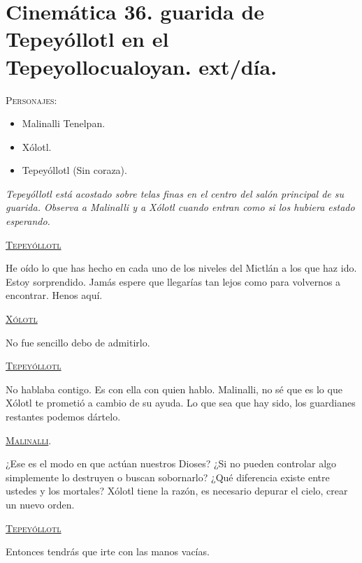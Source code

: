 \section{Cinemática 36. guarida de Tepeyóllotl en el Tepeyollocualoyan. ext/día. } \label{Cin:Cinematica36}
 \textsc{Personajes}:
 \begin{itemize}
 \item Malinalli Tenelpan.
 \item Xólotl.
 \item Tepeyóllotl (Sin coraza).
 \end{itemize}
\textit{Tepeyóllotl está acostado sobre telas finas en el centro del salón principal de su guarida. Observa a Malinalli y a Xólotl cuando entran como si los hubiera estado esperando.}
\begin{center}
\textsc{\underline{Tepeyóllotl}}
\\
\par
He oído lo que has hecho en cada uno de los niveles del Mictlán a los que haz ido. Estoy sorprendido. Jamás espere que llegarías tan lejos como para volvernos a encontrar. Henos aquí.
\\
\par
\textsc{\underline{Xólotl}}
\\
\par
No fue sencillo debo de admitirlo.
\\
\par
\textsc{\underline{Tepeyóllotl}}
\\
\par
No hablaba contigo. Es con ella con quien hablo. Malinalli, no sé que es lo que Xólotl te prometió a cambio de su ayuda. Lo que sea que hay sido, los guardianes restantes podemos dártelo. 
\\
\par
\textsc{\underline{Malinalli}}.
\\
\par
¿Ese es el modo en que actúan nuestros Dioses? ¿Si no pueden controlar algo simplemente lo destruyen o buscan sobornarlo? ¿Qué diferencia existe entre ustedes y los mortales? Xólotl tiene la razón, es necesario depurar el cielo, crear un nuevo orden.
\\
\par
\textsc{\underline{Tepeyóllotl}}
\\
\par
Entonces tendrás que irte con las manos vacías.
\end{center}